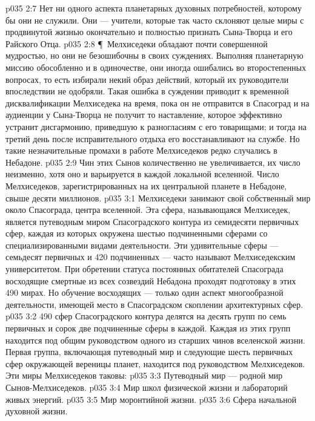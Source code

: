 \vs p035 2:7 Нет ни одного аспекта планетарных духовных потребностей, которому бы они не служили. Они --- учители, которые так часто склоняют целые миры с продвинутой жизнью окончательно и полностью признать Сына\hyp{}Творца и его Райского Отца.
\vs p035 2:8 \P\ Мелхиседеки обладают почти совершенной мудростью, но они не безошибочны в своих суждениях. Выполняя планетарную миссию обособленно и в одиночестве, они иногда ошибались во второстепенных вопросах, то есть избирали некий образ действий, который их руководители впоследствии не одобряли. Такая ошибка в суждении приводит к временной дисквалификации Мелхиседека на время, пока он не отправится в Спасоград и на аудиенции у Сына\hyp{}Творца не получит то наставление, которое эффективно устранит дисгармонию, приведшую к разногласиям с его товарищами; и тогда на третий день после исправительного отдыха его восстанавливают на службе. Но такие незначительные промахи в работе Мелхиседеков редко случались в Небадоне.
\vs p035 2:9 Чин этих Сынов количественно не увеличивается, их число неизменно, хотя оно и варьируется в каждой локальной вселенной. Число Мелхиседеков, зарегистрированных на их центральной планете в Небадоне, свыше десяти миллионов.
\vs p035 3:1 Мелхиседеки занимают свой собственный мир около Спасограда, центра вселенной. Эта сфера, называющаяся Мелхиседек, является путеводным миром Спасоградского контура из семидесяти первичных сфер, каждая из которых окружена шестью подчиненными сферами со специализированными видами деятельности. Эти удивительные сферы --- семьдесят первичных и 420 подчиненных --- часто называют Мелхиседекским университетом. При обретении статуса постоянных обитателей Спасограда восходящие смертные из всех созвездий Небадона проходят подготовку в этих 490 мирах. Но обучение восходящих --- только один аспект многообразной деятельности, имеющей место в Спасоградском скоплении архитектурных сфер.
\vs p035 3:2 490 сфер Спасоградского контура делятся на десять групп по семь первичных и сорок две подчиненные сферы в каждой. Каждая из этих групп находится под общим руководством одного из старших чинов вселенской жизни. Первая группа, включающая путеводный мир и следующие шесть первичных сфер окружающей вереницы планет, находится под руководством Мелхиседеков. Эти миры Мелхиседеков таковы:
\vs p035 3:3 \bibnobreakspace Путеводный мир --- родной мир Сынов\hyp{}Мелхиседеков.
\vs p035 3:4 \bibnobreakspace Мир школ физической жизни и лабораторий живых энергий.
\vs p035 3:5 \bibnobreakspace Мир моронтийной жизни.
\vs p035 3:6 \bibnobreakspace Сфера начальной духовной жизни.

